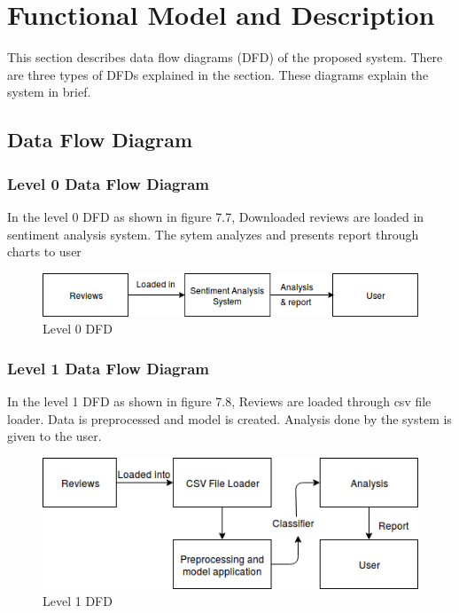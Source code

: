 \documentclass[oneside,a4paper,12pt]{pictreport}
\begin{document}
\section{Functional Model and Description}
This section describes data flow diagrams (DFD) of the proposed system. There are three types of DFDs explained in the section. These diagrams explain the system in brief.

\subsection{Data Flow Diagram}
\subsubsection{Level 0 Data Flow Diagram}
In the level 0 DFD as shown in figure 7.7, Downloaded reviews are loaded in sentiment analysis system. The sytem analyzes and presents report
through charts to user\\
\begin{figure}[h!]
\begin{center}
 


\includegraphics[width=4.5in]{level_0.png}
\caption{Level 0 DFD}
\end{center}
\end{figure}

\subsubsection{Level 1 Data Flow Diagram}
In the level 1 DFD as shown in figure 7.8, Reviews are loaded through csv file loader. Data is preprocessed and model is created.
Analysis done by the system is given to the user.\\
\begin{figure}[h!]
\includegraphics[width=4.5in]{level_1.png}
\caption{Level 1 DFD}
\end{figure}
\end{document}
